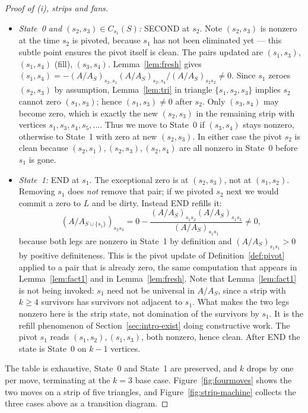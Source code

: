\documentclass[11pt]{article}
\theoremstyle{plain}
\theoremstyle{definition}
\theoremstyle{remark}
\begin{document}
\begin{aiblock}
\begin{proof}[Proof of (i), strips and fans]
\begin{itemize}
\item \emph{State~0 and $(s_2,s_3)\in C_{s_1}(S)$:} SECOND at $s_2$. Note $(s_2,s_3)$ is nonzero at the time $s_2$ is pivoted, because $s_1$ has not been eliminated yet — this subtle point ensures the pivot itself is clean. The pairs updated are $(s_1,s_3)$, $(s_1,s_4)$ (fill), $(s_3,s_4)$. Lemma~\ref{lem:fresh} gives $(s_1,s_4)=-(A/A_S)_{s_2,s_1}(A/A_S)_{s_2,s_4}/(A/A_S)_{s_2s_2}\neq0$. Since $s_1$ zeroes $(s_2,s_3)$ by assumption, Lemma~\ref{lem:tri} in triangle $\{s_1,s_2,s_3\}$ implies $s_2$ cannot zero $(s_1,s_3)$; hence $(s_1,s_3)\neq0$ after $s_2$. Only $(s_3,s_4)$ may become zero, which is exactly the new $(s_2,s_3)$ in the remaining strip with vertices $s_1,s_3,s_4,s_5,\dots$. Thus we move to State~0 if $(s_3,s_4)$ stays nonzero, otherwise to State~1 with zero at new $(s_2,s_3)$. In either case the pivot $s_2$ is clean because $(s_2,s_1),(s_2,s_3),(s_2,s_4)$ are all nonzero in State~0 before $s_1$ is gone.

\item \emph{State~1:} END at $s_1$. The exceptional zero is at $(s_2,s_3)$, not at $(s_1,s_2)$. Removing $s_1$ does \emph{not} remove that pair; if we pivoted $s_2$ next we would commit a zero to $L$ and be dirty. Instead END refills it:
\[
(A/A_{S\cup\{s_1\}})_{s_2s_3}=0-\frac{(A/A_S)_{s_1s_2}(A/A_S)_{s_1s_3}}{(A/A_S)_{s_1s_1}}\neq0,
\]
because both legs are nonzero in State~1 by definition and $(A/A_S)_{s_1s_1}>0$ by positive
definiteness. This is the pivot update of Definition~\ref{def:pivot} applied to a pair that is
already zero, the same computation that appears in Lemma~\ref{lem:fact1} and in
Lemma~\ref{lem:fresh}. Note that Lemma~\ref{lem:fact1} is not being invoked: $s_1$ need not be
universal in $A/A_S$, since a strip with $k\ge4$ survivors has survivors not adjacent to $s_1$. What
makes the two legs nonzero here is the strip state, not domination of the survivors by $s_1$. It is
the refill phenomenon of Section~\ref{sec:intro-exist} doing constructive work. The pivot $s_1$ reads $(s_1,s_2),(s_1,s_3)$, both nonzero, hence clean. After END the state is State~0 on $k-1$ vertices.
\end{itemize}
The table is exhaustive, State~0 and State~1 are preserved, and $k$ drops by one per move,
terminating at the $k=3$ base case. Figure~\ref{fig:fourmoves} shows the two moves on a strip of five
triangles, and Figure~\ref{fig:strip-machine} collects the three cases above as a transition diagram.


\end{proof}
\end{aiblock}
\end{document}
